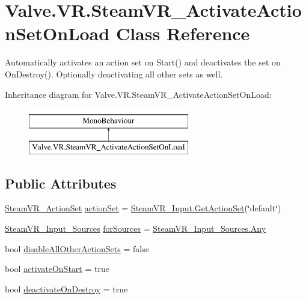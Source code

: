 \hypertarget{class_valve_1_1_v_r_1_1_steam_v_r___activate_action_set_on_load}{}\section{Valve.\+V\+R.\+Steam\+V\+R\+\_\+\+Activate\+Action\+Set\+On\+Load Class Reference}
\label{class_valve_1_1_v_r_1_1_steam_v_r___activate_action_set_on_load}


Automatically activates an action set on Start() and deactivates the set on On\+Destroy(). Optionally deactivating all other sets as well.  


Inheritance diagram for Valve.\+V\+R.\+Steam\+V\+R\+\_\+\+Activate\+Action\+Set\+On\+Load\+:\begin{figure}[H]
\begin{center}
\leavevmode
\includegraphics[height=2.000000cm]{class_valve_1_1_v_r_1_1_steam_v_r___activate_action_set_on_load}
\end{center}
\end{figure}
\subsection*{Public Attributes}
\begin{DoxyCompactItemize}
\item 
\mbox{\hyperlink{class_valve_1_1_v_r_1_1_steam_v_r___action_set}{Steam\+V\+R\+\_\+\+Action\+Set}} \mbox{\hyperlink{class_valve_1_1_v_r_1_1_steam_v_r___activate_action_set_on_load_a946a5336899170149f65ac8cfbd1fb1e}{action\+Set}} = \mbox{\hyperlink{class_valve_1_1_v_r_1_1_steam_v_r___input_a645e9f34de97217c31c20ba913c8d3e6}{Steam\+V\+R\+\_\+\+Input.\+Get\+Action\+Set}}(\char`\"{}default\char`\"{})
\item 
\mbox{\hyperlink{namespace_valve_1_1_v_r_a82e5bf501cc3aa155444ee3f0662853f}{Steam\+V\+R\+\_\+\+Input\+\_\+\+Sources}} \mbox{\hyperlink{class_valve_1_1_v_r_1_1_steam_v_r___activate_action_set_on_load_ab0b79113b7517f519100eaf6414e7ef3}{for\+Sources}} = \mbox{\hyperlink{namespace_valve_1_1_v_r_a82e5bf501cc3aa155444ee3f0662853faed36a1ef76a59ee3f15180e0441188ad}{Steam\+V\+R\+\_\+\+Input\+\_\+\+Sources.\+Any}}
\item 
bool \mbox{\hyperlink{class_valve_1_1_v_r_1_1_steam_v_r___activate_action_set_on_load_afd39a2c3122d6f89b432db7ab843a71a}{disable\+All\+Other\+Action\+Sets}} = false
\item 
bool \mbox{\hyperlink{class_valve_1_1_v_r_1_1_steam_v_r___activate_action_set_on_load_ae1337118e7ccb399cbd26e537f666e64}{activate\+On\+Start}} = true
\item 
bool \mbox{\hyperlink{class_valve_1_1_v_r_1_1_steam_v_r___activate_action_set_on_load_a390075349f88b63a8444171e6039911c}{deactivate\+On\+Destroy}} = true
\end{DoxyCompactItemize}


